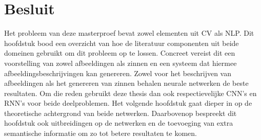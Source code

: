 \section{Besluit}
Het probleem van deze masterproef bevat zowel elementen uit CV als NLP. Dit hoofdstuk bood een overzicht van hoe de literatuur componenten uit beide domeinen gebruikt om dit probleem op te lossen. Concreet vereist dit een voorstelling van zowel afbeeldingen als zinnen en een systeem dat hiermee afbeeldingsbeschrijvingen kan genereren. Zowel voor het beschrijven van afbeeldingen als het genereren van zinnen behalen neurale netwerken de beste resultaten. Om die reden gebruikt deze thesis dan ook respectievelijke CNN's en RNN's voor beide deelproblemen. Het volgende hoofdstuk gaat dieper in op de theoretische achtergrond van beide netwerken. Daarbovenop bespreekt dit hoofdstuk ook uitbreidingen op de netwerken en de toevoeging van extra semantische informatie om zo tot betere resultaten te komen.

